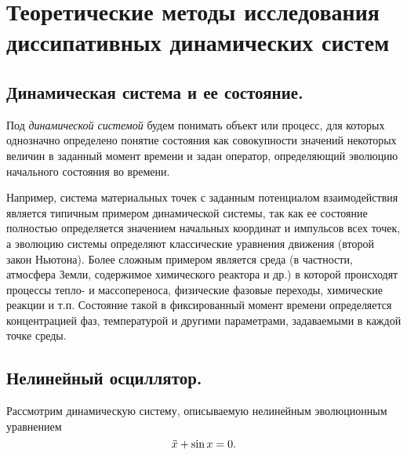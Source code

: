 \section{Теоретические методы исследования диссипативных динамических систем}
\subsection{Динамическая система и ее состояние.}Под \textit{динамической системой} будем понимать объект или процесс, для которых однозначно определено понятие состояния как совокупности значений некоторых величин в заданный момент времени и задан оператор, определяющий эволюцию начального состояния во времени.

Например, система материальных точек с заданным потенциалом взаимодействия является типичным примером динамической системы, так как ее состояние полностью определяется значением начальных координат и импульсов всех точек, а эволюцию системы определяют классические уравнения движения (второй закон Ньютона). Более сложным примером является среда (в частности, атмосфера Земли, содержимое химического реактора и др.) в которой происходят процессы тепло- и массопереноса, физические фазовые переходы, химические реакции и т.п. Состояние такой в фиксированный момент времени определяется концентрацией фаз, температурой и другими параметрами, задаваемыми в каждой точке среды.
\subsection{Нелинейный осциллятор.} Рассмотрим динамическую систему, описываемую нелинейным эволюционным уравнением
\begin{equation*}
    \Ddot{x} + \sin{x} = 0.
\end{equation*}

